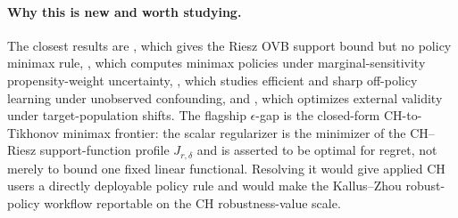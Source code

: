 \documentclass[11pt]{article}
\theoremstyle{definition}
\theoremstyle{plain}
\theoremstyle{remark}
\begin{document}
\paragraph{Why this is new and worth studying.}
The closest results are \citet{ChernozhukovCinelliNeweySharmaSyrgkanis2022}, which gives the Riesz OVB support bound but no policy minimax rule, \citet{KallusZhou2021}, which computes minimax policies under marginal-sensitivity propensity-weight uncertainty, \citet{HessFrauenMelnychukFeuerriegel2026}, which studies efficient and sharp off-policy learning under unobserved confounding, and \citet{AdjahoChristensen2025}, which optimizes external validity under target-population shifts. The flagship $\epsilon$-gap is the closed-form CH-to-Tikhonov minimax frontier: the scalar regularizer is the minimizer of the CH--Riesz support-function profile $J_{r,\delta}$ and is asserted to be optimal for regret, not merely to bound one fixed linear functional. Resolving it would give applied CH users a directly deployable policy rule and would make the Kallus--Zhou robust-policy workflow reportable on the CH robustness-value scale.
\end{document}
